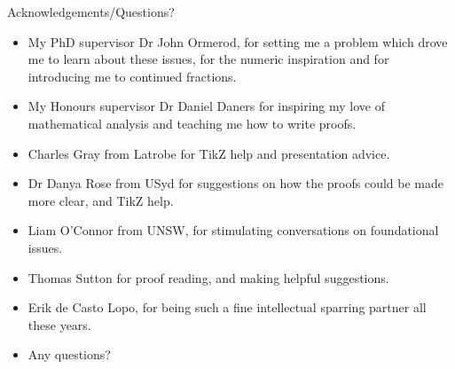 \documentclass{beamer}
\begin{document}
\begin{frame}{Acknowledgements/Questions?}
\begin{itemize}
\item My PhD supervisor Dr John Ormerod, for setting me a problem which drove me to learn about these
			issues, for the numeric inspiration and for introducing me to continued fractions.
\item My Honours supervisor Dr Daniel Daners for inspiring my love of mathematical analysis and teaching
			me how to write proofs.
\item Charles Gray from Latrobe for TikZ help and presentation advice.
\item Dr Danya Rose from USyd for suggestions on how the proofs could be made more clear, and TikZ help.
\item Liam O'Connor from UNSW, for stimulating conversations on foundational issues.
\item Thomas Sutton for proof reading, and making helpful suggestions.
\item Erik de Casto Lopo, for being such a fine intellectual sparring partner all these years.
\item Any questions?
\end{itemize}
\end{frame}

\end{document}
